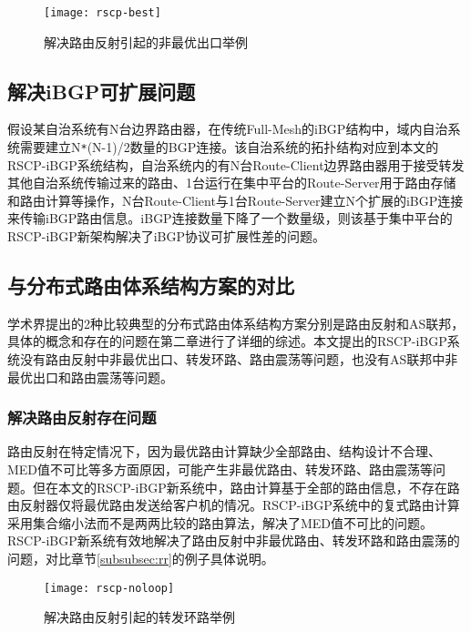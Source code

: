 \begin{figure}
  \centering
  \texttt{[image: rscp-best]}
  \caption{解决路由反射引起的非最优出口举例}
  \label{fig:rscp-best}
\end{figure}


\subsection{解决iBGP可扩展问题}

假设某自治系统有N台边界路由器，在传统Full-Mesh的iBGP结构中，域内自治系统需要建立N\verb+*+(N-1)/2数量的BGP连接。该自治系统的拓扑结构对应到本文的RSCP-iBGP系统结构，自治系统内的有N台Route-Client边界路由器用于接受转发其他自治系统传输过来的路由、1台运行在集中平台的Route-Server用于路由存储和路由计算等操作，N台Route-Client与1台Route-Server建立N个扩展的iBGP连接来传输iBGP路由信息。iBGP连接数量下降了一个数量级，则该基于集中平台的RSCP-iBGP新架构解决了iBGP协议可扩展性差的问题。

\subsection{与分布式路由体系结构方案的对比}

学术界提出的2种比较典型的分布式路由体系结构方案分别是路由反射和AS联邦，具体的概念和存在的问题在第二章进行了详细的综述。本文提出的RSCP-iBGP系统没有路由反射中非最优出口、转发环路、路由震荡等问题，也没有AS联邦中非最优出口和路由震荡等问题。

\subsubsection{解决路由反射存在问题}



路由反射在特定情况下，因为最优路由计算缺少全部路由、结构设计不合理、MED值不可比等多方面原因，可能产生非最优路由、转发环路、路由震荡等问题。但在本文的RSCP-iBGP新系统中，路由计算基于全部的路由信息，不存在路由反射器仅将最优路由发送给客户机的情况。RSCP-iBGP系统中的复式路由计算采用集合缩小法而不是两两比较的路由算法，解决了MED值不可比的问题。RSCP-iBGP新系统有效地解决了路由反射中非最优路由、转发环路和路由震荡的问题，对比章节\ref{subsubsec:rr}的例子具体说明。\\

\begin{figure}
  \centering
  \texttt{[image: rscp-noloop]}
  \caption{解决路由反射引起的转发环路举例}
  \label{fig:rscp-noloop}
\end{figure}


